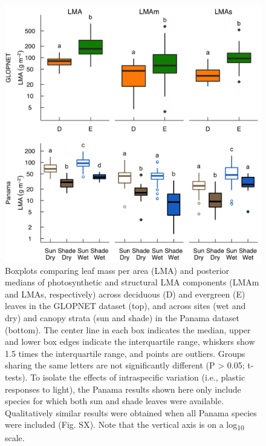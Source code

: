 \documentclass[
  12pt,
]{article}
\begin{document}
\begin{figure}
\hypertarget{fig:boxplt}{%
\centering
\includegraphics{../figs/box_main.png}
\caption{Boxplots comparing leaf mass per area (LMA) and posterior medians of photosynthetic and structural LMA components (LMAm and LMAs, respectively) across deciduous (D) and evergreen (E) leaves in the GLOPNET dataset (top), and across sites (wet and dry) and canopy strata (sun and shade) in the Panama dataset (bottom).
The center line in each box indicates the median, upper and lower box edges indicate the interquartile range, whiskers show 1.5 times the interquartile range, and points are outliers.
Groups sharing the same letters are not significantly different (P \textgreater{} 0.05; t-tests). To isolate the effects of intraspecific variation (i.e., plastic responses to light), the Panama results shown here only include species for which both sun and shade leaves were available.
Qualitatively similar results were obtained when all Panama species were included (Fig. SX).
Note that the vertical axis is on a log\textsubscript{10} scale.}\label{fig:boxplt}
}
\end{figure}

\newpage
\end{document}

